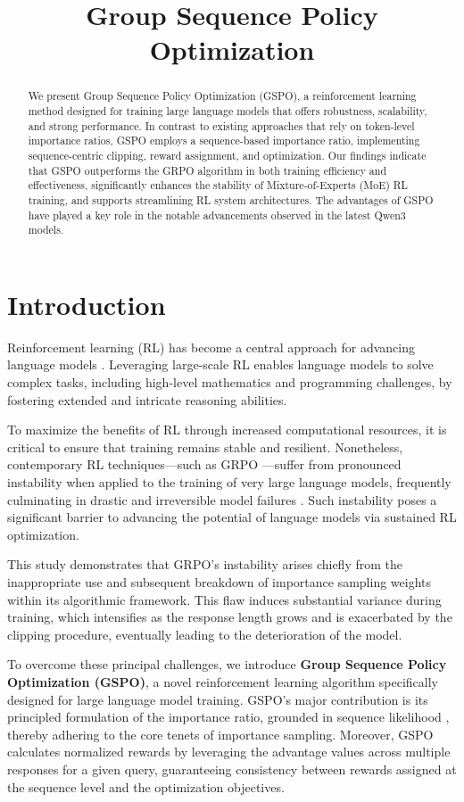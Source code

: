 \title{Group Sequence Policy Optimization}

\begin{abstract}
We present Group Sequence Policy Optimization (GSPO), a reinforcement learning method designed for training large language models that offers robustness, scalability, and strong performance. In contrast to existing approaches that rely on token-level importance ratios, GSPO employs a sequence-based importance ratio, implementing sequence-centric clipping, reward assignment, and optimization. Our findings indicate that GSPO outperforms the GRPO algorithm in both training efficiency and effectiveness, significantly enhances the stability of Mixture-of-Experts (MoE) RL training, and supports streamlining RL system architectures. The advantages of GSPO have played a key role in the notable advancements observed in the latest Qwen3 models.
\end{abstract}

\section{Introduction}
\label{sec:intro}

Reinforcement learning (RL) has become a central approach for advancing language models \citep{o1,dpsk-r1,qwq32b,qwen3}. Leveraging large-scale RL enables language models to solve complex tasks, including high-level mathematics and programming challenges, by fostering extended and intricate reasoning abilities.

To maximize the benefits of RL through increased computational resources, it is critical to ensure that training remains stable and resilient. Nonetheless, contemporary RL techniques—such as GRPO \citep{grpo}—suffer from pronounced instability when applied to the training of very large language models, frequently culminating in drastic and irreversible model failures \citep{qwen3, minimax-m1}. Such instability poses a significant barrier to advancing the potential of language models via sustained RL optimization.

This study demonstrates that GRPO’s instability arises chiefly from the inappropriate use and subsequent breakdown of importance sampling weights within its algorithmic framework. This flaw induces substantial variance during training, which intensifies as the response length grows and is exacerbated by the clipping procedure, eventually leading to the deterioration of the model.

To overcome these principal challenges, we introduce \textbf{Group Sequence Policy Optimization (GSPO)}, a novel reinforcement learning algorithm specifically designed for large language model training. GSPO’s major contribution is its principled formulation of the importance ratio, grounded in sequence likelihood \citep{click}, thereby adhering to the core tenets of importance sampling. Moreover, GSPO calculates normalized rewards by leveraging the advantage values across multiple responses for a given query, guaranteeing consistency between rewards assigned at the sequence level and the optimization objectives.

